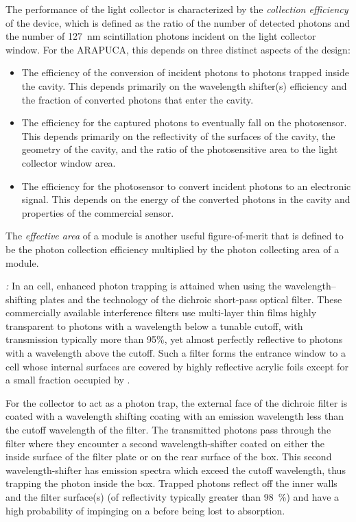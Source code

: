 The performance of the light collector is characterized by the \emph{collection efficiency} of the device, which is defined as the ratio of the number of detected photons and the number of \SI{127}{nm} scintillation photons incident on the light collector window.  For the ARAPUCA, this depends on three distinct aspects of the design:
\begin{itemize}
    \item The efficiency of the conversion of incident  photons to photons trapped inside the cavity. This depends primarily on the wavelength shifter(s) efficiency and the fraction of converted photons that enter the cavity.
    \item The efficiency for the captured photons to eventually fall on the photosensor. This depends primarily on the reflectivity of the surfaces of the cavity, the geometry of the cavity, and the ratio of the photosensitive area to the light collector window area.
    \item The efficiency for the photosensor to convert incident photons to an electronic signal. This depends on the energy of the converted photons in the cavity and properties of the commercial sensor.
\end{itemize}
The \emph{effective area} of a  module is another useful figure-of-merit that is defined to be the photon collection efficiency multiplied by the photon collecting area of a  module. 

\textit{:} In an  cell, enhanced photon trapping is attained when using the wavelength--shifting plates and the technology of the dichroic short-pass optical filter. These commercially available interference filters use multi-layer thin films highly transparent to photons with a wavelength below a tunable cutoff, 
with transmission typically more than 95\%, yet almost perfectly reflective to photons with a wavelength above the cutoff.  Such a filter forms the entrance window to a cell whose internal surfaces are covered by highly reflective acrylic foils
except for a small fraction occupied by .

For the collector to act as a photon trap, the external face of the dichroic filter is coated with a wavelength shifting coating with an emission wavelength less than the cutoff wavelength of the filter. 
The transmitted photons pass through the filter where they encounter a second wavelength-shifter coated on either the inside surface of the filter plate or on the rear surface of the box.
This second wavelength-shifter has emission spectra which exceed the cutoff wavelength, thus trapping the photon inside the box.
Trapped photons reflect off the inner walls and the filter surface(s) (of reflectivity typically greater than \SI{98}{\%}) 
and have a high probability of impinging on a  before being lost to absorption. 

